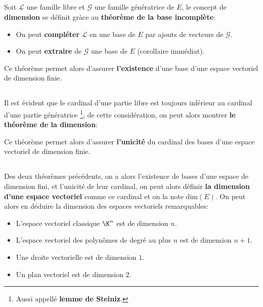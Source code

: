\subsection*{}
Soit \(\mathcal{L}\) une famille libre et \(\mathcal{G}\) une famille génératrice de \(E\), le concept de \textbf{dimension} se définit gràce au \textbf{théorème de la base incomplète}:
\begin{itemize}
   \item On peut \textbf{compléter} \(\mathcal{L}\) en une base de \(E\) par ajouts de vecteurs de \(\mathcal{G}\).
   \item On peut \textbf{extraire} de \(\mathcal{G}\) une base de \(E\) (corollaire immédiat).
\end{itemize}
Ce théorème permet alors d'assurer \textbf{l'existence} d'une base d'une espace vectoriel de dimension finie.

\subsection*{}
Il est évident que le cardinal d'une partie libre est toujours inférieur au cardinal d'une partie génératrice \footnote[1]{Aussi appellé \textbf{lemme de Steiniz}.}, de cette considération, on peut alors montrer \textbf{le théorème de la dimension}:
\begin{center}
\end{center}
Ce théorème permet alors d'assurer \textbf{l'unicité} du cardinal des bases d'une espace vectoriel de dimension finie.\<

\subsection*{}
Des deux théorèmes précédents, on a alors l'existence de bases d'une espace de dimension fini, et l'unicité de leur cardinal, on peut alors définir \textbf{la dimension d'une espace vectoriel} comme ce cardinal et on la note \(\text{dim}(E)\).\<
On peut alors en déduire la dimension des espaces vectoriels remarquables:
\begin{itemize}
   \item L'espace vectoriel classique \(\K^n\) est de dimension \(n\).
   \item L'espace vectoriel des polynômes de degré au plus \(n\) est de dimension \(n + 1\).
   \item Une droite vectorielle est de dimension \(1\).
   \item Un plan vectoriel est de dimension \(2\).
\end{itemize}

